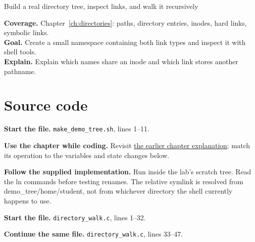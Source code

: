 \begin{labproject}{Build a real directory tree, inspect links, and walk it recursively}

\textbf{Coverage.} Chapter~\ref{ch:directories}: paths, directory entries, inodes, hard links, symbolic links.\\
\textbf{Goal.} Create a small namespace containing both link types and inspect it with shell tools.\\
\textbf{Explain.} Explain which names share an inode and which link stores another pathname.




\section*{Source code}
\noindent\textbf{Start the file.} \texttt{make\_demo\_tree.sh}, lines 1--11.



\textbf{Use the chapter while coding.} Revisit \hyperref[ch:directories]{the earlier chapter explanation}; match its operation to the variables and state changes below.

\textbf{Follow the supplied implementation.} Run inside the lab's scratch tree. Read the ln commands before testing renames. The relative symlink is resolved from demo\_tree/home/student, not from whichever directory the shell currently happens to use.




\noindent\textbf{Start the file.} \texttt{directory\_walk.c}, lines 1--32.


\noindent\textbf{Continue the same file.} \texttt{directory\_walk.c}, lines 33--47.



\end{labproject}
